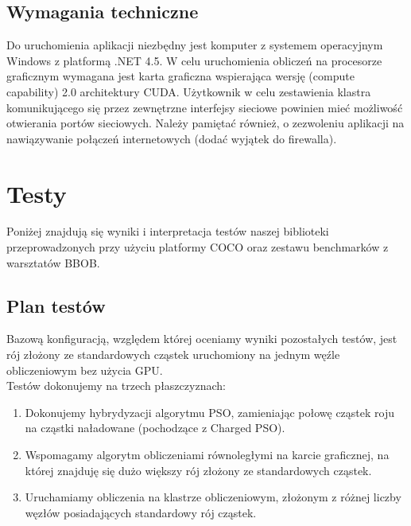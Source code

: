 \documentclass[12pt, twoside, openany, abstract=on]{report}
\theoremstyle{definition}
\begin{document}
\section{Wymagania techniczne}

Do uruchomienia aplikacji niezbędny jest komputer z systemem operacyjnym Windows z
platformą .NET 4.5. W celu uruchomienia obliczeń na procesorze graficznym wymagana jest karta graficzna wspierająca wersję (compute capability) 2.0 architektury CUDA.
Użytkownik w celu zestawienia klastra komunikującego się przez zewnętrzne interfejsy sieciowe powinien mieć możliwość otwierania portów sieciowych. Należy pamiętać również, o zezwoleniu aplikacji na nawiązywanie połączeń internetowych (dodać wyjątek do firewalla).


\chapter{Testy}

Poniżej znajdują się wyniki i interpretacja testów naszej biblioteki przeprowadzonych przy użyciu platformy COCO oraz zestawu benchmarków z warsztatów BBOB.

\section{Plan testów}
Bazową konfiguracją, względem której oceniamy wyniki pozostałych testów, jest rój złożony ze standardowych cząstek uruchomiony na jednym węźle obliczeniowym bez użycia GPU.\\

Testów dokonujemy na trzech płaszczyznach:

\begin{enumerate}
\item{Dokonujemy hybrydyzacji algorytmu PSO, zamieniając połowę cząstek roju na cząstki naładowane (pochodzące z Charged PSO).}

\item{Wspomagamy algorytm obliczeniami równoległymi na karcie graficznej, na której znajduję się dużo większy rój złożony ze standardowych cząstek.}

\item{Uruchamiamy obliczenia na klastrze obliczeniowym, złożonym z różnej liczby węzłów posiadających standardowy rój cząstek.}
\end{enumerate}
\end{document}
